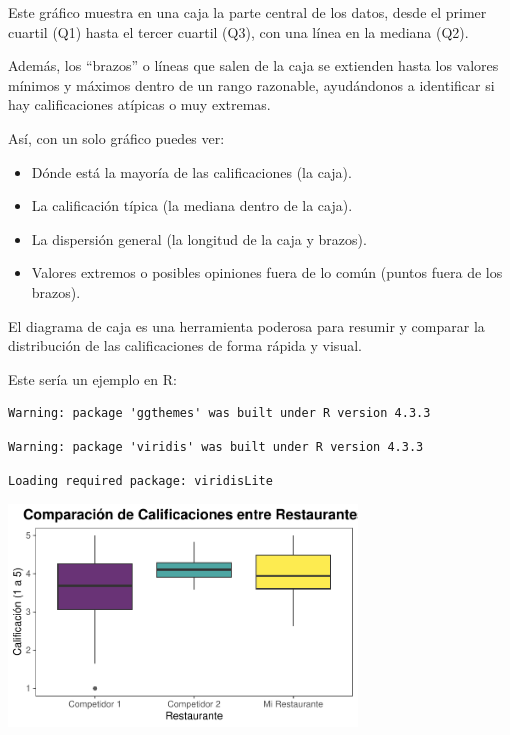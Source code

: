 \documentclass[
  spanish,
  letterpaper,
  DIV=11,
  numbers=noendperiod]{scrreprt}
\providecommand{\tightlist}{%
  \setlength{\itemsep}{0pt}\setlength{\parskip}{0pt}}
\begin{document}
Este gráfico muestra en una caja la parte central de los datos, desde el
primer cuartil (Q1) hasta el tercer cuartil (Q3), con una línea en la
mediana (Q2).

Además, los ``brazos'' o líneas que salen de la caja se extienden hasta
los valores mínimos y máximos dentro de un rango razonable, ayudándonos
a identificar si hay calificaciones atípicas o muy extremas.

Así, con un solo gráfico puedes ver:

\begin{itemize}
\tightlist
\item
  Dónde está la mayoría de las calificaciones (la caja).\\
\item
  La calificación típica (la mediana dentro de la caja).\\
\item
  La dispersión general (la longitud de la caja y brazos).\\
\item
  Valores extremos o posibles opiniones fuera de lo común (puntos fuera
  de los brazos).
\end{itemize}

El diagrama de caja es una herramienta poderosa para resumir y comparar
la distribución de las calificaciones de forma rápida y visual.

Este sería un ejemplo en R:

\begin{verbatim}
Warning: package 'ggthemes' was built under R version 4.3.3
\end{verbatim}

\begin{verbatim}
Warning: package 'viridis' was built under R version 4.3.3
\end{verbatim}

\begin{verbatim}
Loading required package: viridisLite
\end{verbatim}

\begin{center}
\includegraphics[width=3.64583in,height=\textheight,keepaspectratio]{capitulo3_files/figure-pdf/unnamed-chunk-12-1.pdf}
\end{center}
\end{document}

